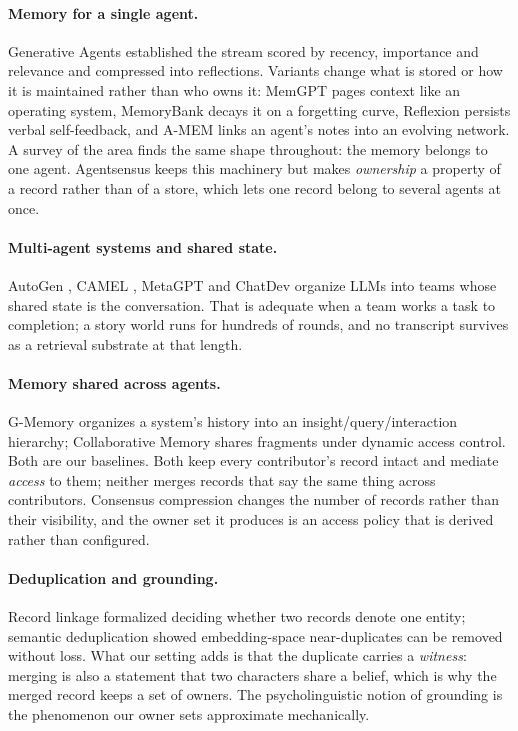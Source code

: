 \documentclass{article}
\begin{document}
\paragraph{Memory for a single agent.} Generative Agents
\citep{park2023generative} established the stream scored by recency, importance
and relevance and compressed into reflections. Variants change what is stored or
how it is maintained rather than who owns it: MemGPT \citep{packer2023memgpt}
pages context like an operating system, MemoryBank \citep{zhong2024memorybank}
decays it on a forgetting curve, Reflexion \citep{shinn2023reflexion} persists
verbal self-feedback, and A-MEM \citep{xu2025amem} links an agent's notes into an
evolving network. A survey of the area \citep{zhang2024memsurvey} finds the same
shape throughout: the memory belongs to one agent. Agentsensus keeps this
machinery but makes \emph{ownership} a property of a record rather than of a
store, which lets one record belong to several agents at once.

\paragraph{Multi-agent systems and shared state.} AutoGen
\citep{wu2023autogen}, CAMEL \citep{li2023camel}, MetaGPT
\citep{hong2024metagpt} and ChatDev \citep{qian2024chatdev} organize LLMs into
teams whose shared state is the conversation. That is adequate when a team works
a task to completion; a story world runs for hundreds of rounds, and no
transcript survives as a retrieval substrate at that length.

\paragraph{Memory shared across agents.} G-Memory \citep{zhang2025gmemory}
organizes a system's history into an insight/query/interaction hierarchy;
Collaborative Memory \citep{rezazadeh2025collaborative} shares fragments under
dynamic access control. Both are our baselines. Both keep every contributor's
record intact and mediate \emph{access} to them; neither merges records that say
the same thing across contributors. Consensus compression changes the number of
records rather than their visibility, and the owner set it produces is an access
policy that is derived rather than configured.

\paragraph{Deduplication and grounding.} Record linkage
\citep{fellegi1969record} formalized deciding whether two records denote one
entity; semantic deduplication \citep{abbas2023semdedup} showed embedding-space
near-duplicates can be removed without loss. What our setting adds is that the
duplicate carries a \emph{witness}: merging is also a statement that two
characters share a belief, which is why the merged record keeps a set of owners.
The psycholinguistic notion of grounding \citep{clark1991grounding} is the
phenomenon our owner sets approximate mechanically.
\end{document}
